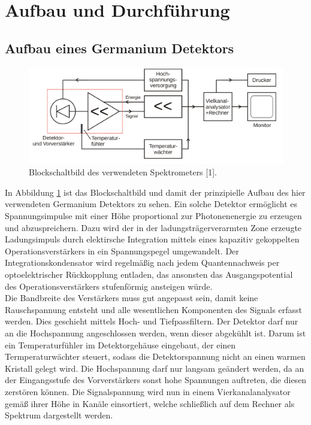 \section{Aufbau und Durchführung}
\label{sec:Durchführung}

\subsection{Aufbau eines Germanium Detektors}

\begin{figure}
    \centering
    \includegraphics[scale=0.3]{content/aufbau.png}
    \caption{Blockschaltbild des verwendeten Spektrometers [1].}
    \label{fig:aufbau}
\end{figure}


In Abbildung \ref{fig:aufbau} ist das Blockschaltbild und damit der prinzipielle Aufbau des hier verwendeten Germanium Detektors zu sehen. Ein solche Detektor ermöglicht es 
Spannungsimpulse mit einer Höhe proportional zur Photonenenergie zu erzeugen und abzuspreichern. Dazu wird der in der ladungsträgerverarmten Zone erzeugte 
Ladungsimpuls durch elektirsche Integration mittels eines kapazitiv gekoppelten Operationsverstärkers in ein Spannungspegel umgewandelt. Der Integrationskondensator
wird regelmäßig nach jedem Quantennachweis per optoelektrischer Rückkopplung entladen, das ansonsten das Ausgangspotential des Operationsverstärkers stufenförmig 
ansteigen würde. \\
Die Bandbreite des Verstärkers muss gut angepasst sein, damit keine Rauschspannung entsteht und alle wesentlichen Komponenten des Signals erfasst werden. Dies 
geschieht mittels Hoch- und Tiefpassfiltern. Der Detektor darf nur an die Hochspannung angeschlossen werden, wenn dieser abgekühlt ist. Darum ist ein Temperaturfühler
im Detektorgehäuse eingebaut, der einen Termperaturwächter steuert, sodass die Detektorspannung nicht an einen warmen Kristall gelegt wird. Die Hochspannung 
darf nur langsam geändert werden, da an der Eingangsstufe des Vorverstärkers sonst hohe Spannungen auftreten, die diesen zerstören können. Die Signalspannung wird nun
in einem Vierkanalanalysator gemäß ihrer Höhe in Kanäle einsortiert, welche schließlich auf dem Rechner als Spektrum dargestellt werden. 

